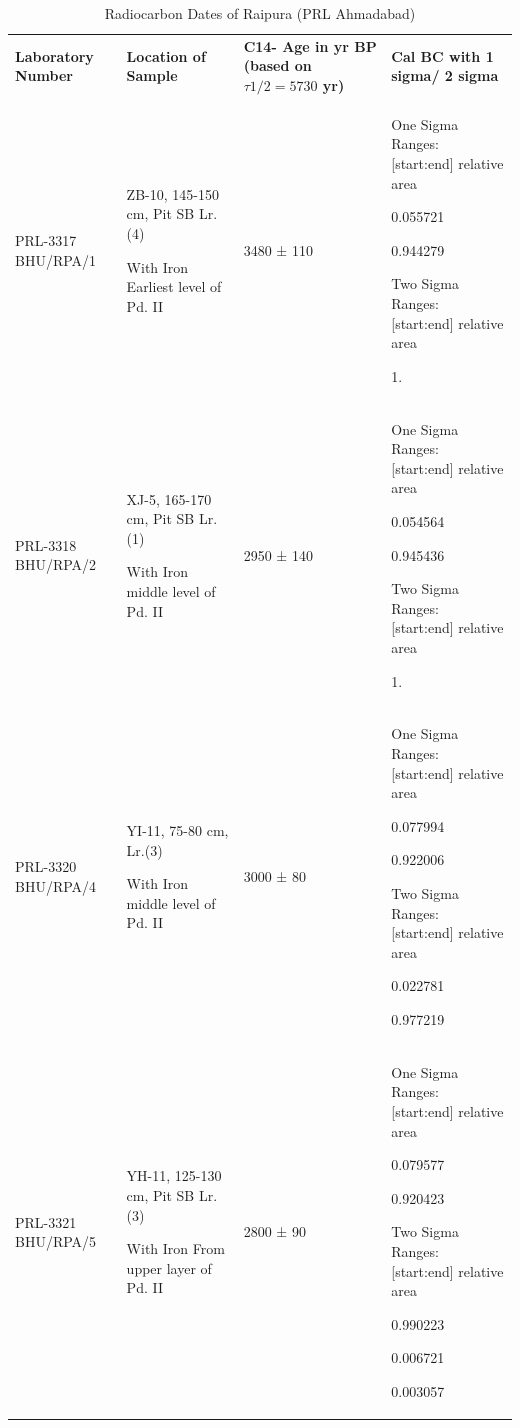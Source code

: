{{\setlength\tabcolsep{2pt}
{\fontsize{7}{9}\selectfont
\begin{longtable}{|p{1.3cm}|p{1.6cm}|p{1.6cm}|p{4.4cm}|}
\captionsetup{font=footnotesize}
\caption{Radiocarbon Dates of Raipura (PRL Ahmadabad)} \label{table III.10}\\
\hline
\multicolumn{1}{|m{1.3cm}|}{\centering \textbf{Laboratory Number}} &
\multicolumn{1}{m{1.6cm}|}{\centering \textbf{Location of Sample}} & 
\multicolumn{1}{m{1.6cm}|}{\centering \textbf{C14- Age in yr BP (based on $\tau1/2=5730$ yr) }} & 
\multicolumn{1}{m{4.4cm}|}{\centering \textbf{Cal  BC with 1 sigma/ 2 sigma}}\\
\endfirsthead
\hline
\endhead
\hline
\endfoot
\hline
PRL-3317 BHU/RPA/1 & ZB-10, 145-150 cm, Pit SB Lr.(4)\par  With Iron Earliest level of Pd. II & 3480 ± 110 & One Sigma Ranges: [start:end] relative area \par [cal BC 1867: cal BC 1848] 0.055721 \par [cal BC 1774: cal BC 1527] 0.944279\par  Two Sigma Ranges: [start:end] relative area\par [cal BC 1932: cal BC 1438] 1.\\
PRL-3318 BHU/RPA/2  &  XJ-5, 165-170 cm, Pit SB Lr.(1) \par With Iron middle level of Pd. II & 2950 ± 140 & One Sigma Ranges: [start:end] relative area \par  [cal BC 1257: cal BC 1234] 0.054564 \par  [cal BC 1216: cal BC 899] 0.945436 \par  Two Sigma Ranges: [start:end] relative area \par  [cal BC 1395: cal BC 803] 1.\\
PRL-3320  BHU/RPA/4 & YI-11, 75-80 cm, Lr.(3)\par With Iron middle level of Pd. II & 3000 ± 80  & One Sigma Ranges: [start:end] relative area\par  [cal BC 1257: cal BC 1235] 0.077994 \par [cal BC 1216: cal BC 1006] 0.922006\par Two Sigma Ranges: [start:end] relative area \par [cal BC 1372: cal BC 1343] 0.022781 \par  [cal BC 1318: cal BC 911] 0.977219\\
PRL-3321 BHU/RPA/5  & YH-11, 125-130 cm, Pit SB Lr.(3) \par With Iron From upper layer of Pd. II & 2800 ± 90 & One Sigma Ranges: [start:end] relative area \par [cal BC 974: cal BC 957] 0.079577 \par [cal BC 940: cal BC 801] 0.920423 \par Two Sigma Ranges: [start:end] relative area \par  [cal BC 1128: cal BC 754] 0.990223 \par [cal BC 685: cal BC 668] 0.006721\par [cal BC 609: cal BC 598] 0.003057\\

\end{longtable}}}}
